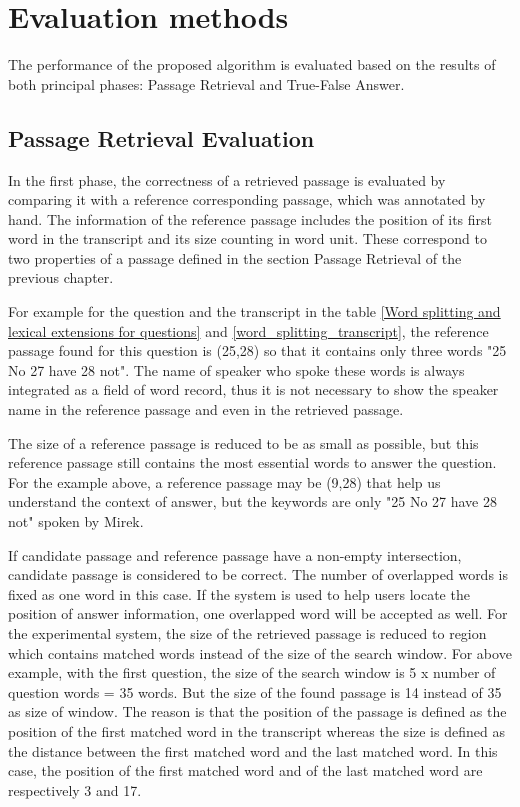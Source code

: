 \chapter{Evaluation methods}

The performance of the proposed algorithm is evaluated based on the results of both principal phases: Passage Retrieval and True-False Answer. 




\section{Passage Retrieval Evaluation}
In the first phase, the correctness of a retrieved passage is evaluated by comparing it with a reference corresponding passage, which was annotated by hand. The information of the reference passage includes the position of its first word in the transcript and its size counting in word unit. These correspond to two properties of a passage defined in the section Passage Retrieval of the previous chapter. 

For example for the question and the transcript in the table \ref{Word splitting and lexical extensions for questions} and \ref{word_splitting_transcript}, the reference passage found for this question is (25,28) so that it contains only three words "25 No 27 have 28 not". The name of speaker who spoke these words is always integrated as a field of word record, thus it is not necessary to show the speaker name in the reference passage and even in the retrieved passage.

The size of a reference passage is reduced to be as small as possible, but this reference passage still contains the most essential words to answer the question. For the example above, a reference passage may be (9,28) that help us understand the context of answer, but the keywords are only "25 No 27 have 28 not" spoken by Mirek.

If candidate passage and reference passage have a non-empty intersection, candidate passage is considered to be correct. The number of overlapped words is fixed as one word in this case. If the system is used to help users locate the position of answer information, one overlapped word will be accepted as well. For the experimental system, the size of the retrieved passage is reduced to region which contains matched words instead of the size of the search window. For above example, with the first question, the size of the search window is 5 x number of question words = 35 words. But the size of the found passage is 14 instead of 35 as size of window. The reason is that the position of the passage is defined as the position of the first matched word in the transcript whereas the size is defined as the distance between the first matched word and the last matched word. In this case, the position of the first matched word and of the last matched word are respectively 3 and 17.


